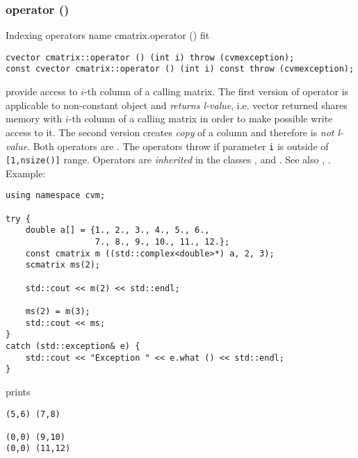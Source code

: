 \subsubsection{operator ()}
Indexing operators%
\pdfdest name {cmatrix.operator ()} fit
\begin{verbatim}
cvector cmatrix::operator () (int i) throw (cvmexception);
const cvector cmatrix::operator () (int i) const throw (cvmexception);
\end{verbatim}
provide access to \hbox{$i$-th} column of a calling matrix. The first version
of operator is applicable to  non-constant object and
\emph{returns  l-value}, i.e. vector returned shares memory
with \hbox{$i$-th} column of a calling matrix
in order to make possible write access to it.
The second version creates  \emph{copy} of a column and therefore is
\emph{not  l-value}.
Both operators are \Based.
The operators throw 
if parameter \verb"i" is outside of \verb"[1,nsize()]" range.
Operators are \emph{inherited}
in the classes
,  
and .
See also ,
.
Example:
\begin{Verbatim}
using namespace cvm;

try {
    double a[] = {1., 2., 3., 4., 5., 6.,
                  7., 8., 9., 10., 11., 12.};
    const cmatrix m ((std::complex<double>*) a, 2, 3);
    scmatrix ms(2);

    std::cout << m(2) << std::endl;

    ms(2) = m(3);
    std::cout << ms;
}
catch (std::exception& e) {
    std::cout << "Exception " << e.what () << std::endl;
}
\end{Verbatim}
prints
\begin{Verbatim}
(5,6) (7,8)

(0,0) (9,10)
(0,0) (11,12)
\end{Verbatim}
\newpage




